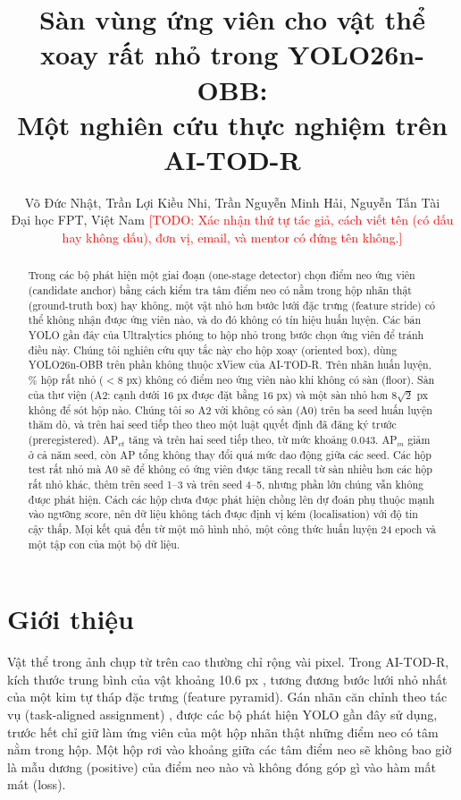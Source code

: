 \documentclass[11pt]{article}
\newcommand{\todo}[1]{\textcolor{red}{[TODO: #1]}}
\begin{document}
\title{Sàn vùng ứng viên cho vật thể xoay rất nhỏ trong YOLO26n-OBB:\\ Một nghiên cứu thực nghiệm trên AI-TOD-R}
\author{Võ Đức Nhật, Trần Lợi Kiều Nhi, Trần Nguyễn Minh Hải, Nguyễn Tấn Tài\\ Đại học FPT, Việt Nam
\todo{Xác nhận thứ tự tác giả, cách viết tên (có dấu hay không dấu), đơn vị, email, và mentor có đứng tên không.}}
\date{}
\maketitle

\begin{abstract}
Trong các bộ phát hiện một giai đoạn (one-stage detector) chọn điểm neo ứng viên (candidate anchor) bằng cách kiểm tra tâm
điểm neo có nằm trong hộp nhãn thật (ground-truth box) hay không, một vật nhỏ hơn bước lưới đặc trưng (feature stride) có thể
không nhận được ứng viên nào, và do đó không có tín hiệu huấn luyện. Các bản YOLO gần đây của Ultralytics phóng to hộp nhỏ
trong bước chọn ứng viên để tránh điều này. Chúng tôi nghiên cứu quy tắc này cho hộp xoay (oriented box), dùng YOLO26n-OBB
trên phần không thuộc xView của AI-TOD-R. Trên nhãn huấn luyện, \rqZeroCandVtA\% hộp rất nhỏ ($<8$ px) không có điểm neo ứng
viên nào khi không có sàn (floor). Sàn của thư viện (A2: cạnh dưới 16 px được đặt bằng 16 px) và một sàn nhỏ hơn
$8\sqrt2$ px không để sót hộp nào. Chúng tôi so A2 với không có sàn (A0) trên ba seed huấn luyện thăm dò, và trên hai seed
tiếp theo theo một luật quyết định đã đăng ký trước (preregistered). AP$_{vt}$ tăng \pOneSFour{} và \pOneSFive{} trên hai seed
tiếp theo, từ mức khoảng 0.043. AP$_m$ giảm ở cả năm seed, còn AP tổng không thay đổi quá mức dao động giữa các seed. Các hộp
test rất nhỏ mà A0 sẽ để không có ứng viên được tăng recall từ sàn nhiều hơn các hộp rất nhỏ khác, thêm \mOneOld{} trên seed
1--3 và \mOneNew{} trên seed 4--5, nhưng phần lớn chúng vẫn không được phát hiện. Cách các hộp chưa được phát hiện chồng lên dự
đoán phụ thuộc mạnh vào ngưỡng score, nên dữ liệu không tách được định vị kém (localisation) với độ tin cậy thấp. Mọi kết quả
đến từ một mô hình nhỏ, một công thức huấn luyện 24 epoch và một tập con của một bộ dữ liệu.
\end{abstract}

\section{Giới thiệu}
Vật thể trong ảnh chụp từ trên cao thường chỉ rộng vài pixel. Trong AI-TOD-R, kích thước trung bình của vật khoảng 10.6 px
\cite{aitodr}, tương đương bước lưới nhỏ nhất của một kim tự tháp đặc trưng (feature pyramid). Gán nhãn căn chỉnh theo tác vụ
(task-aligned assignment) \cite{tood}, được các bộ phát hiện YOLO gần đây sử dụng, trước hết chỉ giữ làm ứng viên của một hộp
nhãn thật những điểm neo có tâm nằm trong hộp. Một hộp rơi vào khoảng giữa các tâm điểm neo sẽ không bao giờ là mẫu dương
(positive) của điểm neo nào và không đóng góp gì vào hàm mất mát (loss).
\end{document}

